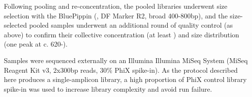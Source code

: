 Following pooling and re-concentration, the pooled libraries underwent size selection with the BluePippin (,  DF Marker R2, broad 400-800bp), and the size-selected pooled samples underwent an additional round of quality control (as above) to confirm their collective concentration (at least ) and size distribution (one peak at c. 620-). 

Samples were sequenced externally on an Illumina Illumina MiSeq System (MiSeq Reagent Kit v3, 2x300bp reads, 30\% PhiX spike-in). As the protocol described here produces a single-amplicon library, a high proportion of PhiX control library spike-in was used to increase library complexity and avoid run failure. %
